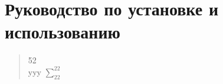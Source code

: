 \section{Руководство по установке и использованию}
\label{sec:manual}

\begin{quote}
 52\\[5em]
 yyy
 $\sum^22_22$
\end{quote}
